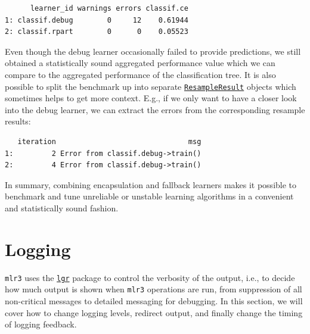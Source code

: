 \begin{verbatim}
      learner_id warnings errors classif.ce
1: classif.debug        0     12    0.61944
2: classif.rpart        0      0    0.05523
\end{verbatim}

Even though the debug learner occasionally failed to provide
predictions, we still obtained a statistically sound aggregated
performance value which we can compare to the aggregated performance of
the classification tree. It is also possible to split the benchmark up
into separate
\href{https://mlr3.mlr-org.com/reference/ResampleResult.html}{\texttt{ResampleResult}}
objects which sometimes helps to get more context. E.g., if we only want
to have a closer look into the debug learner, we can extract the errors
from the corresponding resample results:

\begin{Shaded}
\begin{Highlighting}[]
\OtherTok{=}\NormalTok{ aggr[learner\_id }\SpecialCharTok{==} \NormalTok{]}\SpecialCharTok{$}
\SpecialCharTok{$}\NormalTok{errors[}\SpecialCharTok{:}\NormalTok{]}
\end{Highlighting}
\end{Shaded}

\begin{verbatim}
   iteration                               msg
1:         2 Error from classif.debug->train()
2:         4 Error from classif.debug->train()
\end{verbatim}

In summary, combining encapsulation and fallback learners makes it
possible to benchmark and tune unreliable or unstable learning
algorithms in a convenient and statistically sound fashion.

\hypertarget{sec-logging}{%
\section{\texorpdfstring{Logging}{Logging}}\label{sec-logging}}

\texttt{mlr3} uses the
\href{https://cran.r-project.org/package=lgr}{\texttt{lgr}} package to
control the verbosity of the output, i.e., to decide how much output is
shown when \texttt{mlr3} operations are run, from suppression of all
non-critical messages to detailed messaging for debugging. In this
section, we will cover how to change logging levels, redirect output,
and finally change the timing of logging feedback.

